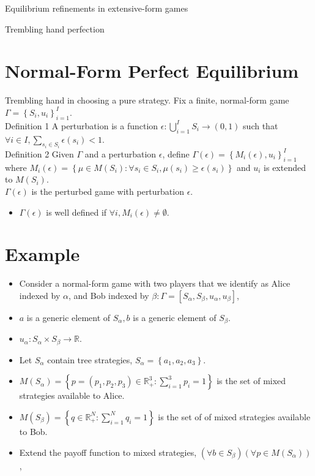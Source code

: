 \documentclass[10pt]{article}
\begin{document}
Equilibrium refinements in extensive-form games

Trembling hand perfection

\section*{Normal-Form Perfect Equilibrium}
Trembling hand in choosing a pure strategy. Fix a finite, normal-form game $\Gamma=\left\{S_{i}, u_{i}\right\}_{i=1}^{I}$.\\
Definition 1 A perturbation is a function $\epsilon: \bigcup_{i=1}^{I} S_{i} \rightarrow(0,1)$ such that $\forall i \in I, \sum_{s_{i} \in S_{i}} \epsilon\left(s_{i}\right)<1$.\\
Definition 2 Given $\Gamma$ and a perturbation $\epsilon$, define $\Gamma(\epsilon)=\left\{M_{i}(\epsilon), u_{i}\right\}_{i=1}^{I}$ where $M_{i}(\epsilon)=\left\{\mu \in M\left(S_{i}\right): \forall s_{i} \in S_{i}, \mu\left(s_{i}\right) \geq \epsilon\left(s_{i}\right)\right\}$ and $u_{i}$ is extended to $M\left(S_{i}\right)$.\\
$\Gamma(\epsilon)$ is the perturbed game with perturbation $\epsilon$.

\begin{itemize}
  \item $\Gamma(\epsilon)$ is well defined if $\forall i, M_{i}(\epsilon) \neq \emptyset$.
\end{itemize}

\section*{Example}
\begin{itemize}
  \item Consider a normal-form game with two players that we identify as Alice indexed by $\alpha$, and Bob indexed by $\beta: \Gamma=\left[S_{\alpha}, S_{\beta}, u_{\alpha}, u_{\beta}\right]$,
  \item $a$ is a generic element of $S_{\alpha}, b$ is a generic element of $S_{\beta}$.
  \item $u_{\alpha}: S_{\alpha} \times S_{\beta} \rightarrow \mathbb{R}$.
  \item Let $S_{\alpha}$ contain tree strategies, $S_{\alpha}=\left\{a_{1}, a_{2}, a_{3}\right\}$.
  \item $M\left(S_{\alpha}\right)=\left\{p=\left(p_{1}, p_{2}, p_{3}\right) \in \mathbb{R}_{+}^{3}: \sum_{i=1}^{3} p_{i}=1\right\}$ is the set of mixed strategies available to Alice.
  \item $M\left(S_{\beta}\right)=\left\{q \in \mathbb{R}_{+}^{N}: \sum_{i=1}^{N} q_{i}=1\right\}$ is the set of of mixed strategies available to Bob.
  \item Extend the payoff function to mixed strategies, $\left(\forall b \in S_{\beta}\right)\left(\forall p \in M\left(S_{\alpha}\right)\right)$,
\end{itemize}
\end{document}
